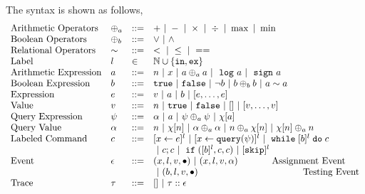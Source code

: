 The syntax is shown as follows,
\[
\begin{array}{llll}
\mbox{Arithmetic Operators} 
& \oplus_a & ::= & + ~|~ - ~|~ \times 
%
~|~ \div ~|~ \max ~|~ \min\\  
\mbox{Boolean Operators} 
& \oplus_b & ::= & \lor ~|~ \land
\\
%
\mbox{Relational Operators} 
& \sim & ::= & < ~|~ \leq ~|~ == 
\\  
%
\mbox{Label} 
& l & \in & \mathbb{N} \cup \{\lin, \lex\} 
\\ 
%
\mbox{Arithmetic Expression} 
& \aexpr & ::= & 
n ~|~ {x} ~|~ \aexpr \oplus_a \aexpr  
 ~|~ \elog \aexpr  ~|~ \esign \aexpr
\\
%
\mbox{Boolean Expression} & \bexpr & ::= & 
%
\etrue ~|~ \efalse  ~|~ \neg \bexpr
 ~|~ \bexpr \oplus_b \bexpr
%
~|~ \aexpr \sim \aexpr 
\\
%
\mbox{Expression} & \expr & ::= & v ~|~ \aexpr ~|~ \bexpr ~|~ [\expr, \dots, \expr]
\\  
%
\mbox{Value} 
& v & ::= & { n ~|~ \etrue ~|~ \efalse ~|~ [] ~|~ [v, \dots, v]}  
\\
%
\mbox{Query Expression} 
& {\qexpr} & ::= 
& { \qval ~|~ \aexpr ~|~ \qexpr \oplus_a \qexpr ~|~ \chi[\aexpr]} 
\\
%
\mbox{Query Value} & \qval & ::= 
& {n ~|~ \chi[n] ~|~ \qval \oplus_a  \qval ~|~ n \oplus_a  \chi[n]
    ~|~ \chi[n] \oplus_a  n}
    \\
\mbox{Labeled Command} 
& {c} & ::= &   [\assign {{x}}{ {\expr}}]^{l} ~|~  [\assign {{x} } {{\query(\qexpr)}}]^{l}
~|~ {\ewhile [ \bexpr ]^{l} \edo {c} }
\\
&&&
~|~ {c};{c}  
~|~ \eif([\bexpr]{}^l , {c}, {c}) 
~|~ [\eskip]^l
\\ 
\mbox{Event} 
& \event & ::= & 
    ({x}, l, v, \bullet) ~|~ ({x}, l, v, \qval)  ~~~~~~~~~~~ \mbox{Assignment Event} \\
&&& ~|~(\bexpr, l, v, \bullet)   ~~~~~~~~~~~~~~~~~~~~~~~~~~~~~~~~~~ \mbox{Testing Event}
\\
\mbox{Trace} & \trace
& ::= & [] ~|~ \trace :: \event
\\
\end{array}
\]

